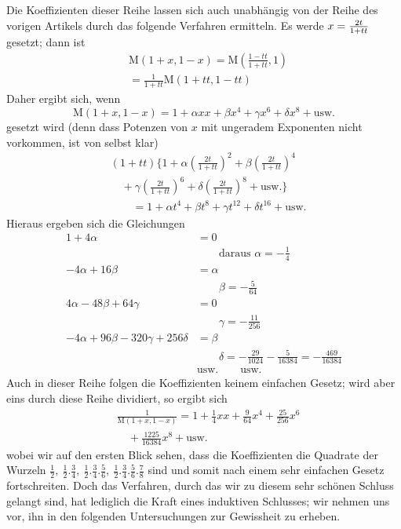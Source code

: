 Die Koeffizienten dieser Reihe lassen sich auch unabhängig von der Reihe des vorigen Artikels durch das folgende Verfahren ermitteln. Es werde \(x=\nobreak{}\frac{2t}{1+tt}\) gesetzt; dann ist
\[
\begin{aligned}&\mathrm{M}(1+x,1-x)=\mathrm{M}(\frac{1-tt}{1+tt},1)\\&=\frac1{1+tt}\mathrm{M}(1+tt,1-tt)\end{aligned}
\]
Daher ergibt sich, wenn
\[
\mathrm{M}(1+x,1-x)=1+\alpha xx+\beta x^4+\gamma x^6+\delta x^8+\text{usw.}
\]
gesetzt wird (denn dass Potenzen von \(x\) mit ungeradem Exponenten nicht vorkommen, ist von selbst klar)
\[
\begin{aligned}
&(1+tt)\{1+\alpha(\frac{2t}{1+tt})^2+\beta(\frac{2t}{1+tt})^4\\&\quad+\gamma(\frac{2t}{1+tt})^6+\delta(\frac{2t}{1+tt})^8+\text{usw.}\}\\[6pt]
&\qquad=1+\alpha t^4+\beta t^8+\gamma t^{12}+\delta t^{16}+\text{usw.}
\end{aligned}
\]
Hieraus ergeben sich die Gleichungen
\[
\begin{aligned}
1+4\alpha&=0\\&\qquad\text{daraus }\alpha=-\frac14\\[6pt]
-4\alpha+16\beta&=\alpha\\&\qquad\beta=-\frac5{64}\\[6pt]
4\alpha-48\beta+64\gamma&=0\\&\qquad\gamma=-\frac{11}{256}\\[6pt]
-4\alpha+96\beta-320\gamma+256\delta&=\beta\\&\qquad\delta=-\frac{29}{1024}-\frac5{16384}=-\frac{469}{16384}\\[6pt]
&\text{usw.}\qquad\text{usw.}
\end{aligned}
\]
Auch in dieser Reihe folgen die Koeffizienten keinem einfachen Gesetz; wird aber eins durch
diese Reihe dividiert, so ergibt sich
\[
\begin{aligned}&\frac1{\mathrm{M}(1+x,1-x)}=1+\frac14xx+\frac9{64}x^4+\frac{25}{256}x^6\\&\quad+\frac{1225}{16384}x^8+\text{usw.}\end{aligned}
\]
wobei wir auf den ersten Blick sehen, dass die Koeffizienten die Quadrate der Wurzeln
\(\frac12,\allowbreak \ \frac12.\frac34,\allowbreak \ \frac12.\frac34.\frac56,\allowbreak \ \frac12.\frac34.\frac56.\frac78\)
sind und somit nach einem sehr einfachen Gesetz fortschreiten. Doch das Verfahren, durch
das wir zu diesem sehr schönen Schluss gelangt sind, hat lediglich die Kraft
eines induktiven Schlusses; wir nehmen uns vor, ihn in den folgenden Untersuchungen
zur Gewissheit zu erheben.

\clearpage
\endgroup
